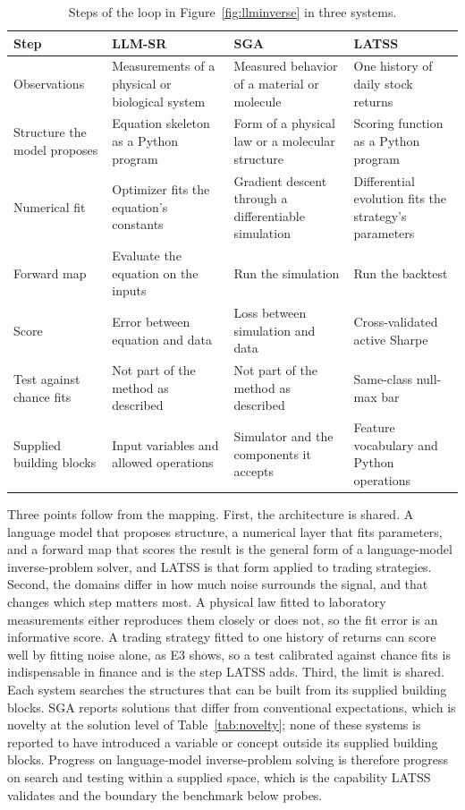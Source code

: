 \documentclass[11pt]{article}
\begin{document}
\begin{table}[htbp]
\centering
\caption{Steps of the loop in Figure~\ref{fig:llminverse} in three systems.}
\label{tab:llminverse}
\small
\begin{tabular}{>{\raggedright\arraybackslash}p{2.9cm} >{\raggedright\arraybackslash}p{3.6cm} >{\raggedright\arraybackslash}p{3.6cm} >{\raggedright\arraybackslash}p{3.6cm}}
\toprule
Step & LLM-SR~\cite{llmsr} & SGA~\cite{sga} & LATSS \\
\midrule
Observations & Measurements of a physical or biological system & Measured behavior of a material or
molecule & One history of daily stock returns \\
\addlinespace
Structure the model proposes & Equation skeleton as a Python program & Form of a physical law or a
molecular structure & Scoring function as a Python program \\
\addlinespace
Numerical fit & Optimizer fits the equation's constants & Gradient descent through a differentiable
simulation & Differential evolution fits the strategy's parameters \\
\addlinespace
Forward map & Evaluate the equation on the inputs & Run the simulation & Run the backtest \\
\addlinespace
Score & Error between equation and data & Loss between simulation and data & Cross-validated active
Sharpe \\
\addlinespace
Test against chance fits & Not part of the method as described & Not part of the method as described &
Same-class null-max bar \\
\addlinespace
Supplied building blocks & Input variables and allowed operations & Simulator and the components it
accepts & Feature vocabulary and Python operations \\
\bottomrule
\end{tabular}
\end{table}

Three points follow from the mapping. First, the architecture is shared. A language model that proposes
structure, a numerical layer that fits parameters, and a forward map that scores the result is the
general form of a language-model inverse-problem solver, and LATSS is that form applied to trading
strategies. Second, the domains differ in how much noise surrounds the signal, and that changes which
step matters most. A physical law fitted to laboratory measurements either reproduces them closely or
does not, so the fit error is an informative score. A trading strategy fitted to one history of returns
can score well by fitting noise alone, as E3 shows, so a test calibrated against chance fits is
indispensable in finance and is the step LATSS adds. Third, the limit is shared. Each system searches
the structures that can be built from its supplied building blocks. SGA reports solutions that differ
from conventional expectations, which is novelty at the solution level of Table~\ref{tab:novelty}; none
of these systems is reported to have introduced a variable or concept outside its supplied building
blocks. Progress on language-model inverse-problem solving is therefore progress on search and testing
within a supplied space, which is the capability LATSS validates and the boundary the benchmark below
probes.
\end{document}
